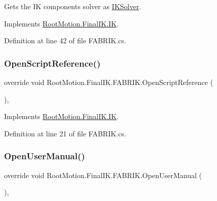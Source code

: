 Gets the IK component\textquotesingle{}s solver as \mbox{\hyperlink{class_root_motion_1_1_final_i_k_1_1_i_k_solver}{I\+K\+Solver}}. 



Implements \mbox{\hyperlink{class_root_motion_1_1_final_i_k_1_1_i_k_ad9ef393e69cd16ba2d6fa06ba06b7a66}{Root\+Motion.\+Final\+I\+K.\+IK}}.



Definition at line 42 of file F\+A\+B\+R\+I\+K.\+cs.

\mbox{\label{class_root_motion_1_1_final_i_k_1_1_f_a_b_r_i_k_aac64228ef162eaa3e39a159400e7f6d4}} 
\subsubsection{\texorpdfstring{Open\+Script\+Reference()}{OpenScriptReference()}}
{\footnotesize\ttfamily override void Root\+Motion.\+Final\+I\+K.\+F\+A\+B\+R\+I\+K.\+Open\+Script\+Reference (\begin{DoxyParamCaption}{ }\end{DoxyParamCaption})\hspace{0.3cm}{\ttfamily [protected]}, {\ttfamily [virtual]}}



Implements \mbox{\hyperlink{class_root_motion_1_1_final_i_k_1_1_i_k_a260f283903b1305b99485c9474c83927}{Root\+Motion.\+Final\+I\+K.\+IK}}.



Definition at line 21 of file F\+A\+B\+R\+I\+K.\+cs.

\mbox{\label{class_root_motion_1_1_final_i_k_1_1_f_a_b_r_i_k_a05b2d0586050c16146e02cde8a0e1b11}} 
\subsubsection{\texorpdfstring{Open\+User\+Manual()}{OpenUserManual()}}
{\footnotesize\ttfamily override void Root\+Motion.\+Final\+I\+K.\+F\+A\+B\+R\+I\+K.\+Open\+User\+Manual (\begin{DoxyParamCaption}{ }\end{DoxyParamCaption})\hspace{0.3cm}{\ttfamily [protected]}, {\ttfamily [virtual]}}



